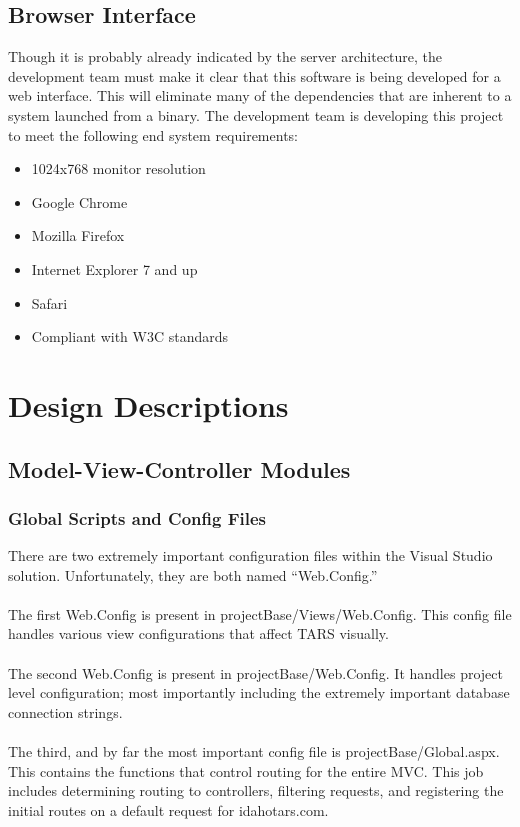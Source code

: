 \documentclass[letterpaper]{article}
\begin{document}
\subsection{Browser Interface}
Though it is probably already indicated by the server architecture, the development team must make it clear that this software is being developed for a web interface. This will eliminate many of the dependencies that are inherent to a system launched from a binary. The development team is developing this project to meet the following end system requirements:
\begin{itemize}
\item 1024x768 monitor resolution
\item Google Chrome
\item Mozilla Firefox
\item Internet Explorer 7 and up
\item Safari
\item Compliant with W3C standards
\end{itemize}
\section{Design Descriptions}
\subsection{Model-View-Controller Modules}
\subsubsection{Global Scripts and Config Files}
There are two extremely important configuration files within the Visual Studio solution. Unfortunately, they are both named ``Web.Config.''\\
\\
The first Web.Config is present in projectBase/Views/Web.Config. This config file handles various view configurations that affect TARS visually.\\
\\
The second Web.Config is present in projectBase/Web.Config. It handles project level configuration; most importantly including the extremely important database connection strings. \\
\\
The third, and by far the most important config file is projectBase/Global.aspx.
This contains the functions that control routing for the entire MVC. This job includes determining routing to controllers, filtering requests, and registering the initial routes on a default request for idahotars.com.
\end{document}
